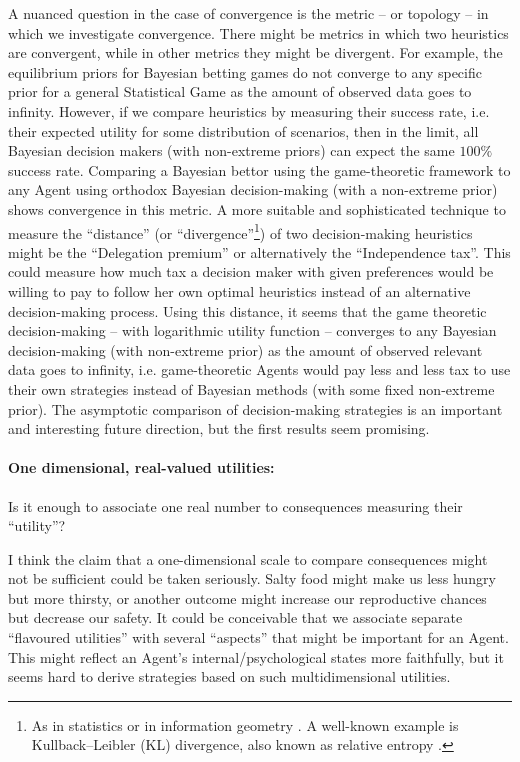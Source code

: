 \documentclass{article}
\begin{document}
A nuanced question in the case of convergence is the metric -- or topology -- in which we investigate convergence. There might be metrics in which two heuristics are convergent, while in other metrics they might be divergent. 
For example, the equilibrium priors for Bayesian betting games do not converge to any specific prior for a general Statistical Game as the amount of observed data goes to infinity. However, if we compare heuristics by measuring their success rate, i.e. their expected utility for some distribution of scenarios, then in the limit, all Bayesian decision makers (with non-extreme priors) can expect the same $100\%$ success rate. Comparing a Bayesian bettor using the game-theoretic framework to any Agent using orthodox Bayesian decision-making (with a non-extreme prior) shows convergence in this metric.
A more suitable and sophisticated technique to measure the ``distance'' (or ``divergence''\footnote{As in statistics or in information geometry \cite{book:AmariInformationGeometry}. A well-known example is Kullback–Leibler (KL) divergence, also known as relative entropy \cite{paper:InformationGeometry,book:AmariInformationGeometry,paper:KullbackLeibler1951}.}) of two decision-making heuristics might be the ``Delegation premium'' or alternatively the ``Independence tax''. This could measure how much tax a decision maker with given preferences would be willing to pay to follow her own optimal heuristics instead of an alternative decision-making process. 
Using this distance, it seems that the game theoretic decision-making -- with logarithmic utility function -- converges to any Bayesian decision-making (with non-extreme prior) as the amount of observed relevant data goes to infinity, i.e. game-theoretic Agents would pay less and less tax to use their own strategies instead of Bayesian methods (with some fixed non-extreme prior).
The asymptotic comparison of decision-making strategies is an important and interesting future direction, but the first results seem promising.

\paragraph{One dimensional, real-valued utilities:}
Is it enough to associate one real number to consequences measuring their ``utility''?

I think the claim that a one-dimensional scale to compare consequences might not be sufficient could be taken seriously. Salty food might make us less hungry but more thirsty, or another outcome might increase our reproductive chances but decrease our safety. It could be conceivable that we associate separate ``flavoured utilities'' with several ``aspects'' that might be important for an Agent.
This might reflect an Agent’s internal/psychological states more faithfully, but it seems hard to derive strategies based on such multidimensional utilities.
\end{document}
